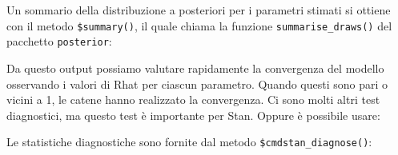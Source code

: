 \documentclass[
  11pt,
]{krantz}
\makeatletter
\newenvironment{Shaded}{\begin{snugshade}}{\end{snugshade}}
\newcommand{\CommentTok}[1]{\textcolor[rgb]{0.37,0.37,0.37}{\textit{#1}}}
\newcommand{\FunctionTok}[1]{\textcolor[rgb]{0,0,0}{#1}}
\newcommand{\NormalTok}[1]{#1}
\newcommand{\SpecialCharTok}[1]{\textcolor[rgb]{0,0,0}{#1}}
\newcommand{\StringTok}[1]{\textcolor[rgb]{0.5,0.5,0.5}{#1}}
\newenvironment{kframe}{%
\medskip{}
\setlength{\fboxsep}{.8em}
 \def\at@end@of@kframe{}%
 \ifinner\ifhmode%
  \def\at@end@of@kframe{\end{minipage}}%
  \begin{minipage}{\columnwidth}%
 \fi\fi%
 \def\FrameCommand##1{\hskip\@totalleftmargin \hskip-\fboxsep
 \colorbox{shadecolor}{##1}\hskip-\fboxsep
     \hskip-\linewidth \hskip-\@totalleftmargin \hskip\columnwidth}%
 \MakeFramed {\advance\hsize-\width
   \@totalleftmargin\z@ \linewidth\hsize
   \@setminipage}}%
 {\par\unskip\endMakeFramed%
 \at@end@of@kframe}
\renewenvironment{Shaded}{\begin{kframe}}{\end{kframe}}
\makeatother
\begin{document}
Un sommario della distribuzione a posteriori per i parametri stimati si ottiene con il metodo \texttt{\$summary()}, il quale chiama la funzione \texttt{summarise\_draws()} del pacchetto \texttt{posterior}:

\begin{Shaded}
\end{Shaded}

Da questo output possiamo valutare rapidamente la convergenza del modello osservando i valori di Rhat per ciascun parametro. Quando questi sono pari o vicini a 1, le catene hanno realizzato la convergenza. Ci sono molti altri test diagnostici, ma questo test è importante per Stan. Oppure è possibile usare:

\begin{Shaded}
\end{Shaded}

Le statistiche diagnostiche sono fornite dal metodo \texttt{\$cmdstan\_diagnose()}:

\begin{Shaded}
\end{Shaded}
\end{document}
